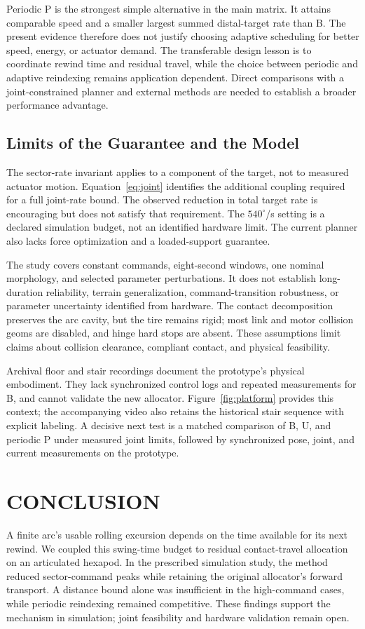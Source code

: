 \documentclass[letterpaper,10pt,conference]{ieeeconf}
\begin{document}
Periodic P is the strongest simple alternative in the main matrix. It attains comparable speed and a smaller largest summed distal-target rate than B. The present evidence therefore does not justify choosing adaptive scheduling for better speed, energy, or actuator demand. The transferable design lesson is to coordinate rewind time and residual travel, while the choice between periodic and adaptive reindexing remains application dependent. Direct comparisons with a joint-constrained planner and external methods are needed to establish a broader performance advantage.

\subsection{Limits of the Guarantee and the Model}
The sector-rate invariant applies to a component of the target, not to measured actuator motion. Equation~\eqref{eq:joint} identifies the additional coupling required for a full joint-rate bound. The observed reduction in total target rate is encouraging but does not satisfy that requirement. The $540^\circ$/s setting is a declared simulation budget, not an identified hardware limit. The current planner also lacks force optimization and a loaded-support guarantee.

The study covers constant commands, eight-second windows, one nominal morphology, and selected parameter perturbations. It does not establish long-duration reliability, terrain generalization, command-transition robustness, or parameter uncertainty identified from hardware. The contact decomposition preserves the arc cavity, but the tire remains rigid; most link and motor collision geoms are disabled, and hinge hard stops are absent. These assumptions limit claims about collision clearance, compliant contact, and physical feasibility.

Archival floor and stair recordings document the prototype's physical embodiment. They lack synchronized control logs and repeated measurements for B, and cannot validate the new allocator. Figure~\ref{fig:platform} provides this context; the accompanying video also retains the historical stair sequence with explicit labeling. A decisive next test is a matched comparison of B, U, and periodic P under measured joint limits, followed by synchronized pose, joint, and current measurements on the prototype.

\section{CONCLUSION}
A finite arc's usable rolling excursion depends on the time available for its next rewind. We coupled this swing-time budget to residual contact-travel allocation on an articulated hexapod. In the prescribed simulation study, the method reduced sector-command peaks while retaining the original allocator's forward transport. A distance bound alone was insufficient in the high-command cases, while periodic reindexing remained competitive. These findings support the mechanism in simulation; joint feasibility and hardware validation remain open.
\end{document}
